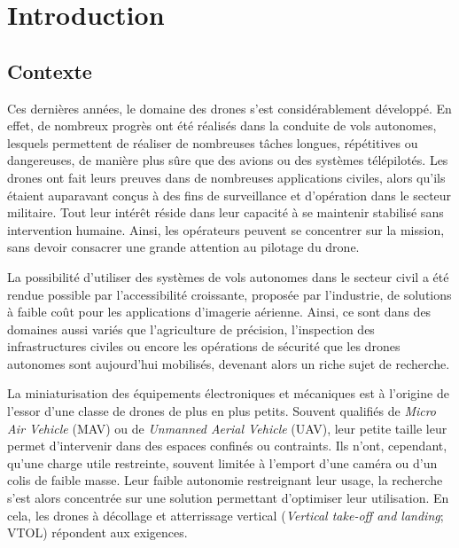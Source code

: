 \chapter*{Introduction}

\renewcommand{\thefigure}{I.\arabic{figure}}

\section*{Contexte}
Ces dernières années, le domaine des drones s'est considérablement développé. En effet, de nombreux progrès ont été réalisés dans la conduite de vols autonomes, lesquels permettent de réaliser de nombreuses tâches longues, répétitives ou dangereuses, de manière plus sûre que des avions ou des systèmes télépilotés. Les drones ont fait leurs preuves dans de nombreuses applications civiles, alors qu'ils étaient auparavant conçus à des fins de surveillance et d'opération dans le secteur militaire. Tout leur intérêt réside dans leur capacité à se maintenir stabilisé sans intervention humaine. Ainsi, les opérateurs peuvent se concentrer sur la mission, sans devoir consacrer une grande attention au pilotage du drone. 

La possibilité d'utiliser des systèmes de vols autonomes dans le secteur civil a été rendue possible par l'accessibilité croissante, proposée par l'industrie, de solutions à faible coût pour les applications d'imagerie aérienne. Ainsi, ce sont dans des domaines aussi variés que l'agriculture de précision,  l'inspection des infrastructures civiles ou encore les opérations de sécurité que les drones autonomes sont aujourd'hui mobilisés, devenant alors un riche sujet de recherche.

La miniaturisation des équipements électroniques et mécaniques est à l'origine de l'essor d'une classe de drones de plus en plus petits. Souvent qualifiés de \textit{Micro Air Vehicle} (MAV) ou de \textit{Unmanned Aerial Vehicle} (UAV), leur petite taille leur permet d'intervenir dans des espaces confinés ou contraints. Ils n'ont, cependant, qu'une charge utile restreinte, souvent limitée à l'emport d'une caméra ou d'un colis de faible masse. Leur faible autonomie restreignant leur usage, la recherche s'est alors concentrée sur une solution permettant d'optimiser leur utilisation. En cela, les drones à décollage et atterrissage vertical (\textit{Vertical take-off and landing}; VTOL) répondent aux exigences.

